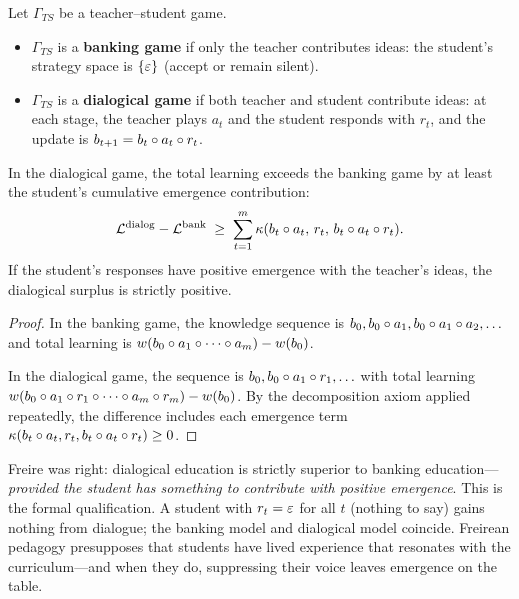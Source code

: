 \begin{definition}
\label{def:freire}
Let $\Gamma_{TS}$ be a teacher--student game.
\begin{itemize}
  \item $\Gamma_{TS}$ is a \textbf{banking game} if only the teacher
    contributes ideas: the student's strategy space is $\{\varepsilon\}$
    (accept or remain silent).
  \item $\Gamma_{TS}$ is a \textbf{dialogical game} if both teacher
    and student contribute ideas: at each stage, the teacher plays
    $a_t$ and the student responds with $r_t$, and the update is
    $b_{t+1} = b_t \circ a_t \circ r_t$.
\end{itemize}
\end{definition}

\begin{theorem}
\label{thm:dialogical-surplus}
In the dialogical game, the total learning exceeds the banking
game by at least the student's cumulative emergence contribution:
\[
  \mathcal{L}^{\mathrm{dialog}} - \mathcal{L}^{\mathrm{bank}}
  \;\ge\; \sum_{t=1}^m \kappa(b_t \circ a_t,\, r_t,\,
    b_t \circ a_t \circ r_t).
\]
If the student's responses have positive emergence with the
teacher's ideas, the dialogical surplus is strictly positive.
\end{theorem}

\begin{proof}
In the banking game, the knowledge sequence is $b_0, b_0 \circ a_1,
b_0 \circ a_1 \circ a_2, \ldots$ and total learning is
$w(b_0 \circ a_1 \circ \cdots \circ a_m) - w(b_0)$.

In the dialogical game, the sequence is $b_0, b_0 \circ a_1
\circ r_1, \ldots$ with total learning
$w(b_0 \circ a_1 \circ r_1 \circ \cdots \circ a_m
\circ r_m) - w(b_0)$.  By the decomposition axiom applied
repeatedly, the difference includes each emergence term
$\kappa(b_t \circ a_t, r_t, b_t \circ a_t \circ r_t) \ge 0$.
\end{proof}

\begin{interpretation}
Freire was right: dialogical education is strictly superior to
banking education---\emph{provided the student has something
to contribute with positive emergence}.  This is the formal
qualification.  A student with $r_t = \varepsilon$ for all $t$
(nothing to say) gains nothing from dialogue; the banking model
and dialogical model coincide.  Freirean pedagogy presupposes
that students have lived experience that resonates with the
curriculum---and when they do, suppressing their voice leaves
emergence on the table.
\end{interpretation}

